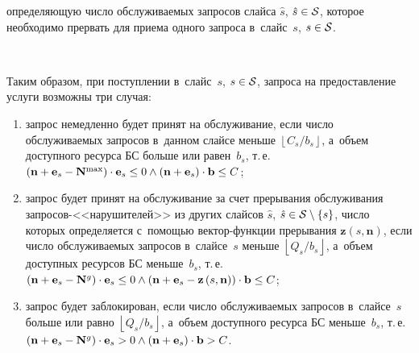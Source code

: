 \begin{multicols}{2}
\vspace*{-3pt}

\noindent
определяющую число об\-слу\-жи\-ва\-емых запросов слайса 
$\hat{s}$, $\hat{s}\hm\in\mathcal{S}$, которое необходимо прервать для приема одного 
запроса в~слайс~$s$, $s\hm\in\mathcal{S}$.

\begin{figure*} %
\vspace*{1pt}
\begin{center}
   \mbox{%
\epsfxsize=161.239mm
}
\end{center}
\vspace*{-9pt}
\label{fig:generalRACScheme}
\end{figure*}

Таким образом, при поступлении в~слайс~$s$, $s\hm\in\mathcal{S}$, запроса на 
предоставление услуги возможны три случая:\\[-14pt]
\begin{enumerate}[(1)]
\item запрос немедленно будет принят на обслуживание, если число об\-слу\-жи\-ва\-емых 
запросов в~данном слайсе меньше $\left\lfloor C_s/b_s \right\rfloor$, а~объем 
доступного ресурса БС больше или равен~$b_s$, т.\,е. 
$\left(\mathbf{n}\hm+\mathbf{e}_s\hm-\mathbf{N}^{\max}\right) \cdot \mathbf{e}_s \hm\leq 
0 \land \left(\mathbf{n}\hm + \mathbf{e}_s\right) \cdot \mathbf{b} \hm\leq C$;
\item запрос будет принят на обслуживание за счет прерывания обслуживания 
за\-про\-сов-<<на\-ру\-ши\-те\-лей>> из других слайсов 
$\hat{s}$, $\hat{s}\hm\in\mathcal{S}\setminus\{s\}$, число которых 
определяется с~по\-мощью век\-тор-функ\-ции прерывания 
$\mathbf{z}\left(s,\mathbf{n}\right)$, если число об\-слу\-жи\-ва\-емых запросов в~слайсе~$s$ 
меньше $\left\lfloor Q_s/b_s \right\rfloor$, а~объем доступных 
ресурсов БС меньше~$b_s$, т.\,е.\ $\left(\mathbf{n}\hm+\mathbf{e}_s \hm-
\mathbf{N}^{g}\right) \cdot \mathbf{e}_s\hm \leq 0 \hm\land \left(\mathbf{n} \hm+ 
\mathbf{e}_s \hm- \mathbf{z}\left(s,\mathbf{n}\right)\right) \cdot \mathbf{b} \hm\leq 
C$;
\item запрос будет заблокирован, если число об\-слу\-жи\-ва\-емых запросов в~слайсе~$s$ 
больше или рав\-но $\left\lfloor Q_s/b_s \right\rfloor$, а~объем доступного 
ресурса БС меньше~$b_s$, т.\,е.\ $\left( \mathbf{n}\hm + \mathbf{e}_s \hm-
\mathbf{N}^{g} \right) \cdot \mathbf{e}_s \hm> 0 \land \left( \mathbf{n} \hm+ 
\mathbf{e}_s \right) \cdot \mathbf{b} \hm> C$.
\end{enumerate}


\end{multicols}
